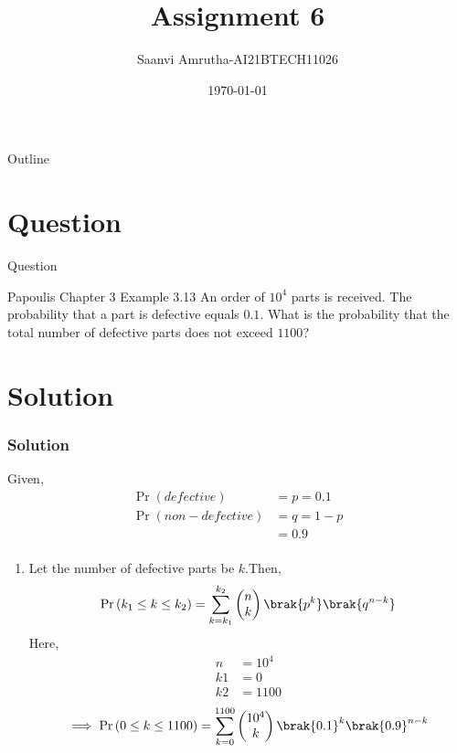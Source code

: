 \documentclass{beamer}
\title{Assignment 6}
\author{Saanvi Amrutha-AI21BTECH11026}
\date{\today}
\newcommand{\myvec}[1]{\ensuremath{\begin{pmatrix}#1\end{pmatrix}}}
\providecommand{\pr}[1]{\ensuremath{\Pr\left(#1\right)}}
\begin{document}
\begin{frame}
    \titlepage 
\end{frame}

\logo{}

\begin{frame}{Outline}
    \tableofcontents
\end{frame}

\section{Question}
\begin{frame}{Question}
    \begin{block}{Papoulis Chapter 3 Example 3.13}
       An order of $10^4$ parts is received. The probability that a part is defective equals $0.1$. What is the probability that the total number of defective parts does not exceed $1100$?
    \end{block}
\end{frame}

\section{Solution}
\begin{frame}
\frametitle{Solution}
Given, 
\begin{align}
\pr{defective}&=p=0.1\\
\pr{non-defective}&=q=1-p\\
&=0.9\\
\end{align}
\end{frame}
\begin{frame}
 \begin{enumerate}
     \item Let the number of defective parts be $k$.Then,\\
     \begin{align}
         \pr{k_1\leq k\leq k_2}=\sum_{k=k_1}^{k_2}\myvec{n\\k}\brak{p^k}\brak{q^{n-k}}\\
     \end{align}
     Here,
     \begin{align}
     n&=10^{4}\\
     k1&=0\\
     k2&=1100
     \end{align} 
     \begin{align}
      \implies\pr{0\leq k\leq 1100}=\sum_{k=0}^{1100}\myvec{10^4\\k}\brak{0.1}^k\brak{0.9}^{n-k}  
     \end{align}
 \end{enumerate}   
\end{frame}
\end{document}
